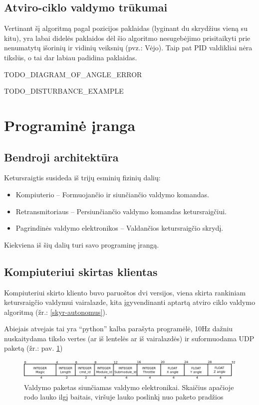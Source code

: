 \documentclass[12pt, a4paper, lithuanian, final]{article}
\begin{document}
\subsection{Atviro-ciklo valdymo trūkumai}

Vertinant šį algoritmą pagal pozicijos paklaidas (lyginant du skrydžius vieną su kitu), yra labai didelės paklaidos dėl šio algoritmo nesugebėjimo prisitaikyti prie nenumatytų išorinių ir vidinių veiksnių (pvz.: Vėjo).
Taip pat PID valdikliai nėra tikslūs, o tai dar labiau padidina paklaidas.

TODO\_DIAGRAM\_OF\_ANGLE\_ERROR

TODO\_DISTURBANCE\_EXAMPLE


\section{Programinė įranga}
\label{skyr-software}
\subsection{Bendroji architektūra}

Ketursraigtis susideda iš trijų esminių fizinių dalių:
\begin{itemize}
	\item Kompiuterio -- Formuojančio ir siunčiančio valdymo komandas.
	\item Retransmitoriaus -- Persiunčiančio valdymo komandas ketursraigčiui.
	\item Pagrindinės valdymo elektronikos -- Valdančios ketursraigčio skrydį.
\end{itemize}

Kiekviena iš šių dalių turi savo programinę įrangą.

\subsection{Kompiuteriui skirtas klientas}

Kompiuteriui skirto kliento buvo paruoštos dvi versijos, viena skirta rankiniam ketursraigčio valdymui vairalazde, kita įgyvendinanti aptartą atviro ciklo valdymo algoritmą (žr.: \ref{skyr-autonomus}).

Abiejais atvejais tai yra "`python"' kalba parašyta programėlė, 10Hz dažniu nuskaitydama tikslo vertes (ar iš lentelės ar iš vairalazdės) ir suformuodama UDP paketą (žr.: pav. \ref{pav-ctrl-packet})

\begin{figure}[H]
\begin{center}
\includegraphics[width=1.0\textwidth]{img/ctrl_packet.png}
\caption{Valdymo paketas siunčiamas valdymo elektronikai. Skaičius apačioje rodo lauko ilgį baitais, viršuje lauko poslinkį nuo paketo pradžios}
\label{pav-ctrl-packet}
\end{center}
\end{figure}
\end{document}

